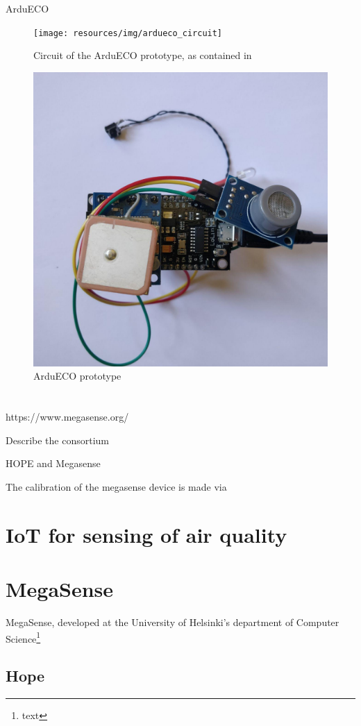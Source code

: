 
ArduECO

\begin{figure}
	\centering
	\texttt{[image: resources/img/ardueco\_circuit]}
	\caption{Circuit of the ArduECO prototype, as contained in \cite{ardueco_paper}}
\end{figure}

\begin{figure}
	\centering
	\includegraphics[width=.5\textwidth]{resources/img/ardueco_picture}
	\caption{ArduECO prototype}
\end{figure}

\section{\megasense}\label{sec:megasense}


https://www.megasense.org/

Describe the consortium

HOPE and Megasense

The calibration of the megasense device is made via

\newpage
\section{IoT for sensing of air quality}

\newpage
\section{MegaSense}

	MegaSense, developed at the University of Helsinki's department of Computer Science\footnote{text}

	\subsection{Hope}
